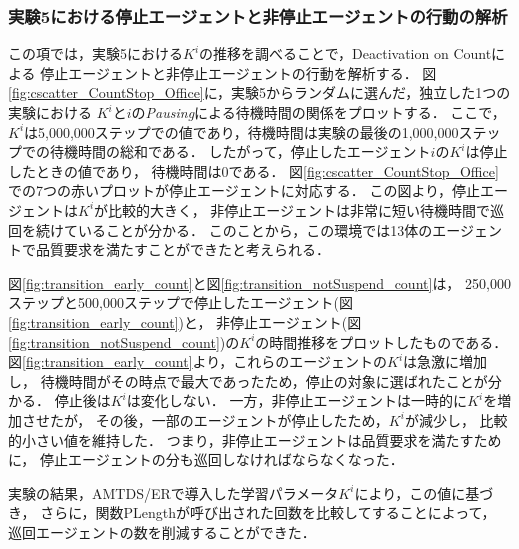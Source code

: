 \documentclass[12pt,a4j,twoside]{jarticle}
\begin{document}
  \subsubsection{実験5における停止エージェントと非停止エージェントの行動の解析}\label{sec:ex5Analsis}
  この項では，実験5における$K^i$の推移を調べることで，Deactivation on Countによる
  停止エージェントと非停止エージェントの行動を解析する．
  図\ref{fig:cscatter_CountStop_Office}に，実験5からランダムに選んだ，独立した1つの実験における
  $K^i$と$i$の{\em Pausing}による待機時間の関係をプロットする．
  ここで，$K^i$は5,000,000ステップでの値であり，待機時間は実験の最後の1,000,000ステップでの待機時間の総和である．
  したがって，停止したエージェント$i$の$K^i$は停止したときの値であり，
  待機時間は0である．
  図\ref{fig:cscatter_CountStop_Office}での7つの赤いプロットが停止エージェントに対応する．
  この図より，停止エージェントは$K^i$が比較的大きく，
  非停止エージェントは非常に短い待機時間で巡回を続けていることが分かる．
  このことから，この環境では13体のエージェントで品質要求を満たすことができたと考えられる．
  \par

  図\ref{fig:transition_early_count}と図\ref{fig:transition_notSuspend_count}は，
  250,000ステップと500,000ステップで停止したエージェント(図\ref{fig:transition_early_count})と，
  非停止エージェント(図\ref{fig:transition_notSuspend_count})の$K^i$の時間推移をプロットしたものである．
  図\ref{fig:transition_early_count}より，これらのエージェントの$K^i$は急激に増加し，
  待機時間がその時点で最大であったため，停止の対象に選ばれたことが分かる．
  停止後は$K^i$は変化しない．
  一方，非停止エージェントは一時的に$K^i$を増加させたが，
  その後，一部のエージェントが停止したため，$K^i$が減少し，
  比較的小さい値を維持した．
  つまり，非停止エージェントは品質要求を満たすために，
  停止エージェントの分も巡回しなければならなくなった．
  \par

  実験の結果，AMTDS/ERで導入した学習パラメータ$K^i$により，この値に基づき，
  さらに，関数\textsf{PLength}が呼び出された回数を比較してすることによって，
  巡回エージェントの数を削減することができた．
\end{document}
